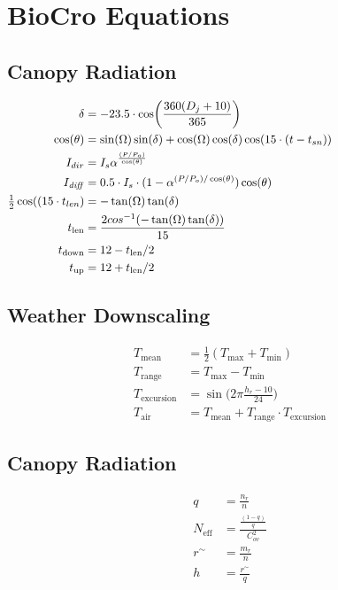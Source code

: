 \documentclass[10pt]{article}
\begin{document}
\section*{BioCro Equations}

\subsection*{Canopy Radiation}

\begin{align}
 \delta  &=  -23.5 \cdot \cos\biggl(\frac{360(D_{j}+10)}{365}\biggr) \hspace{2.5in} \label{eqn:delt} \\
 \cos(\theta)   &=  \sin(\Omega)\sin(\delta)+\cos(\Omega)\cos(\delta)\cos(15\cdot(t-t_{sn}))  \label{eqn:costheta}\\
 I_{dir}   &=  I_{s}\alpha^{\frac{(P/P_{o})}{\cos(\theta)}} \label{eqn:Idir}\\
 I_{\mathit{diff}}  &=   0.5 \cdot I_{s}\cdot(1-\alpha^{(P/P_{o})/\cos(\theta)})\cos(\theta) \\%
\tfrac{1}{2} \cos((15 \cdot t_{len})  &=  -\tan(\Omega)\tan(\delta) \label{eqn:costlen_old}  \\
t_\text{len} &= \frac{2cos^{-1}(-\tan(\Omega)\tan(\delta))}{15}\label{eqn:costlen} \\
t_\text{down} &= 12-t_\text{len}/2\\
t_\text{up} &= 12+t_\text{len}/2
\end{align}


\subsection*{Weather Downscaling}
\begin{align}
T_\text{mean} &= \frac{1}{2}\left(T_\text{max} + T_\text{min}\right)\\
T_\text{range} &= T_\text{max} - T_\text{min}\\
T_\text{excursion}  &=  \sin\biggl(2 \pi \frac{h_{r}-10}{24}\biggr) \label{eqn:excur} \\
 T_\text{air}  &=   T_\text{mean} + T_\text{range} \cdot T_\text{excursion} \label{eqn:Tair} 
\end{align}

\subsection*{Canopy Radiation}
\begin{align}
 q  &=  \frac{n_r}{n} \label{eqn:q} \\
 N_\text{eff}  &=  \frac{\frac{(1-q)}{q}}{C_{ov}^{2}} \label{eqn:Neff}\\
 r^{\sim}  &=  \frac{m_r}{n} \label{eqn:rsim} \\
 h  &=  \frac{r^{\sim}}{q} \label{eqn:h} 
\end{align}
\end{document}
